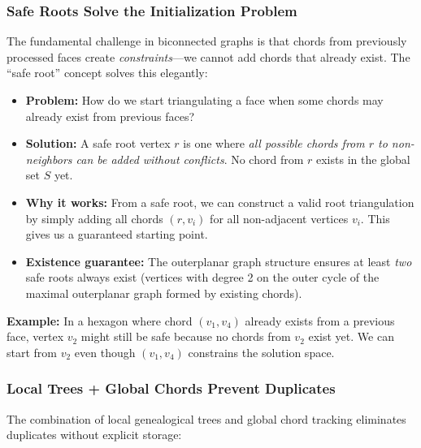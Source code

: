 \documentclass[12pt,a4paper]{article}
\theoremstyle{definition}
\theoremstyle{remark}
\begin{document}
\subsubsection{Safe Roots Solve the Initialization Problem}

The fundamental challenge in biconnected graphs is that chords from previously processed faces create \emph{constraints}---we cannot add chords that already exist. The ``safe root'' concept solves this elegantly:

\begin{itemize}
    \item \textbf{Problem:} How do we start triangulating a face when some chords may already exist from previous faces?
    
    \item \textbf{Solution:} A safe root vertex $r$ is one where \emph{all possible chords from $r$ to non-neighbors can be added without conflicts}. No chord from $r$ exists in the global set $S$ yet.
    
    \item \textbf{Why it works:} From a safe root, we can construct a valid root triangulation by simply adding all chords $(r, v_i)$ for all non-adjacent vertices $v_i$. This gives us a guaranteed starting point.
    
    \item \textbf{Existence guarantee:} The outerplanar graph structure ensures at least \emph{two} safe roots always exist (vertices with degree 2 on the outer cycle of the maximal outerplanar graph formed by existing chords).
\end{itemize}

\textbf{Example:} In a hexagon where chord $(v_1, v_4)$ already exists from a previous face, vertex $v_2$ might still be safe because no chords from $v_2$ exist yet. We can start from $v_2$ even though $(v_1, v_4)$ constrains the solution space.

\subsubsection{Local Trees + Global Chords Prevent Duplicates}

The combination of local genealogical trees and global chord tracking eliminates duplicates without explicit storage:
\end{document}
